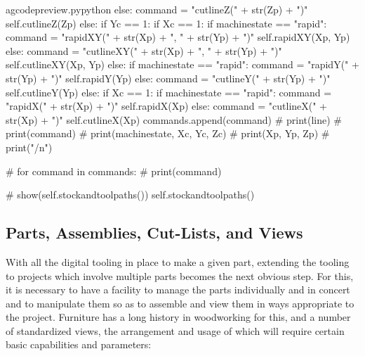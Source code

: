 \documentclass{ltxdoc}
\begin{document}
\begin{writecode}{a}{gcodepreview.py}{python}
                            else: 
                                command = "cutlineZ(" + str(Zp) + ")"
                                self.cutlineZ(Zp)
                else:
                    if Yc == 1:
                        if Xc == 1:
                            if machinestate == "rapid":
                                command = "rapidXY(" + str(Xp) + ", " + str(Yp) + ")"
                                self.rapidXY(Xp, Yp)
                            else: 
                                command = "cutlineXY(" + str(Xp) + ", " + str(Yp) + ")"
                                self.cutlineXY(Xp, Yp)
                        else:
                            if machinestate == "rapid":
                                command = "rapidY(" + str(Yp) + ")"
                                self.rapidY(Yp)
                            else: 
                                command = "cutlineY(" + str(Yp) + ")"
                                self.cutlineY(Yp)
                    else:
                        if Xc == 1:
                            if machinestate == "rapid":
                                command = "rapidX(" + str(Xp) + ")"
                                self.rapidX(Xp)
                            else: 
                                command = "cutlineX(" + str(Xp) + ")"
                                self.cutlineX(Xp)
                commands.append(command)
#                print(line)
#                print(command)
#                print(machinestate, Xc, Yc, Zc)
#                print(Xp, Yp, Zp)
#                print("/n")

#        for command in commands:
#            print(command)

#        show(self.stockandtoolpaths())
        self.stockandtoolpaths()

\end{writecode}
\addtocounter{gcpy}{108}

\subsection{Parts, Assemblies, Cut-Lists, and Views}

With all the digital tooling in place to make a given part, extending the tooling to projects which involve multiple parts becomes the next obvious step. For this, it is necessary to have a facility to manage the parts individually and in concert and to manipulate them so as to assemble and view them in ways appropriate to the project. Furniture has a long history in woodworking for this, and a number of standardized views, the arrangement and usage of which will require certain basic capabilities and parameters:
\end{document}

